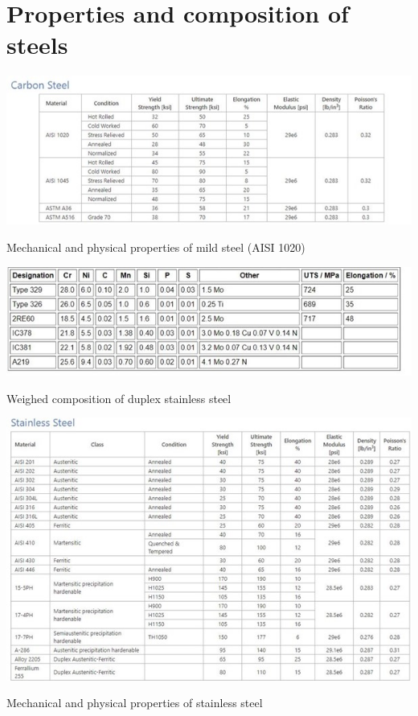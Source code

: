 \documentclass[12pt]{report}
\begin{document}
\chapter{Properties and composition of steels}
\begin{table}[H]
    \centering
    \includegraphics[width=\textwidth]{mechanical_and_physical_properties_of_mild_steel.jpg}
    \caption{Mechanical and physical properties of mild steel (AISI 1020) \cite{kabir2020critical}}
\end{table}

\begin{table}[H]
    \centering
    \includegraphics[width=\textwidth]{weighed_composition_of_duplex_stainless_steel.jpg}
    \caption{Weighed composition of duplex stainless steel \cite{sourmail2005stainless}}
\end{table}

\begin{table}[H]
    \centering
    \includegraphics[width=\textwidth]{mechanical_and_physical_properties_of_stainless_steel.jpg}
    \caption{Mechanical and physical properties of stainless steel \cite{bhadeshia2017steels}}
\end{table}
\end{document}
